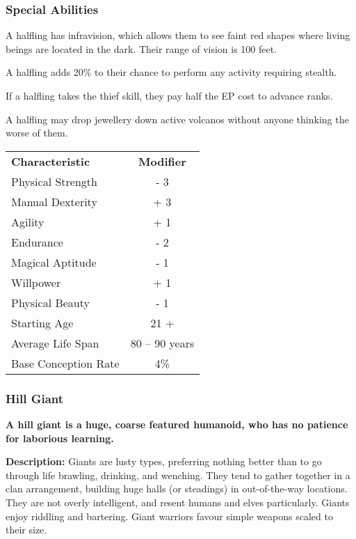 \begin{multicols*}{3}
\subsubsection{Special Abilities}

\begin{Enumerate}
\item
A halfling has infravision, which allows them to see faint red shapes
where living beings are located in the dark. Their range of vision is
100 feet.

\item
A halfling adds 20\% to their chance to perform any activity requiring
stealth.

\item
If a halfling takes the thief skill, they pay half the EP cost to
advance ranks.

\item
A halfling may drop jewellery down active volcanos without anyone
thinking the worse of them.
\end{Enumerate}

\begin{tabularx}{\linewidth}{Xc}
\textbf{Characteristic} & \textbf{Modifier} \\
Physical Strength	& - 3 \\
Manual Dexterity	& + 3 \\
Agility			& + 1 \\
Endurance		& - 2 \\
Magical Aptitude	& - 1 \\
Willpower		& + 1 \\
Physical Beauty		& - 1 \\
Starting Age		& 21 + \\
Average Life Span 	& 80 -- 90 years \\
Base Conception Rate	& 4\% \\
\end{tabularx}

\subsubsection{Hill Giant}

\textbf{A hill giant is a huge, coarse featured humanoid, who has no
patience for laborious learning.}

\textbf{Description:} Giants are lusty types, preferring nothing
better than to go through life brawling, drinking, and wenching. They
tend to gather together in a clan arrangement, building huge halls (or
steadings) in out-of-the-way locations. They are not overly
intelligent, and resent humans and elves particularly. Giants enjoy
riddling and bartering. Giant warriors favour simple weapons scaled to
their size.


\end{multicols*}
